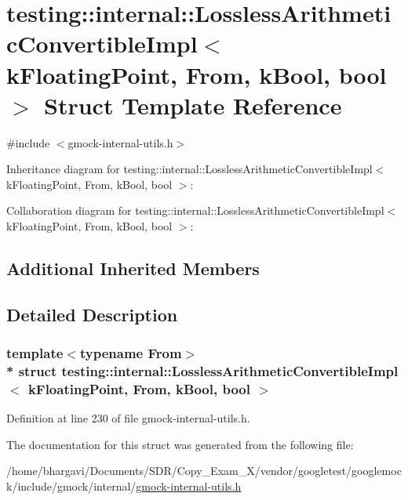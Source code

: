 \hypertarget{structtesting_1_1internal_1_1_lossless_arithmetic_convertible_impl_3_01k_floating_point_00_01_from_00_01k_bool_00_01bool_01_4}{}\section{testing\+:\+:internal\+:\+:Lossless\+Arithmetic\+Convertible\+Impl$<$ k\+Floating\+Point, From, k\+Bool, bool $>$ Struct Template Reference}
\label{structtesting_1_1internal_1_1_lossless_arithmetic_convertible_impl_3_01k_floating_point_00_01_from_00_01k_bool_00_01bool_01_4}


{\ttfamily \#include $<$gmock-\/internal-\/utils.\+h$>$}



Inheritance diagram for testing\+:\+:internal\+:\+:Lossless\+Arithmetic\+Convertible\+Impl$<$ k\+Floating\+Point, From, k\+Bool, bool $>$\+:


Collaboration diagram for testing\+:\+:internal\+:\+:Lossless\+Arithmetic\+Convertible\+Impl$<$ k\+Floating\+Point, From, k\+Bool, bool $>$\+:
\subsection*{Additional Inherited Members}


\subsection{Detailed Description}
\subsubsection*{template$<$typename From$>$\\*
struct testing\+::internal\+::\+Lossless\+Arithmetic\+Convertible\+Impl$<$ k\+Floating\+Point, From, k\+Bool, bool $>$}



Definition at line 230 of file gmock-\/internal-\/utils.\+h.



The documentation for this struct was generated from the following file\+:\begin{DoxyCompactItemize}
\item 
/home/bhargavi/\+Documents/\+S\+D\+R/\+Copy\+\_\+\+Exam\+\_\+X/vendor/googletest/googlemock/include/gmock/internal/\hyperlink{gmock-internal-utils_8h}{gmock-\/internal-\/utils.\+h}\end{DoxyCompactItemize}
